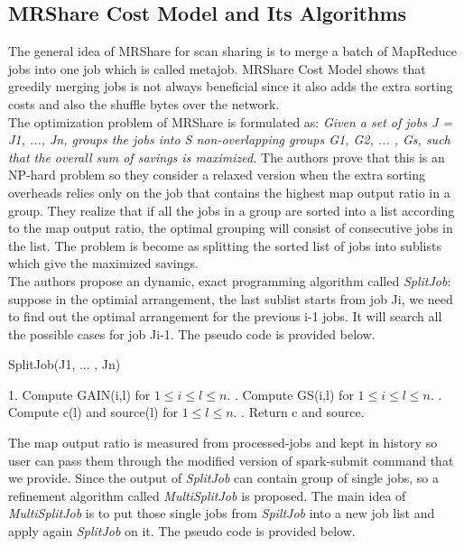 \subsection{MRShare Cost Model and Its Algorithms}
The general idea of MRShare for scan sharing is to merge a batch of MapReduce jobs into one job which is called metajob. MRShare Cost Model shows that greedily merging jobs is not always beneficial since it also adds the extra sorting costs and also the shuffle bytes over the network.\\
The optimization problem of MRShare is formulated as: \textit{Given a set of jobs J = {J1, ..., Jn}, groups the jobs into S non-overlapping groups G1, G2, ... , Gs, such that the overall sum of savings is maximized.} The authors prove that this is an NP-hard problem so they consider a relaxed version when the extra sorting overheads relies only on the job that contains the highest map output ratio in a group. They realize that if all the jobs in a group are sorted into a list according to the map output ratio, the optimal grouping will consist of consecutive jobs in the list. The problem is become as splitting the sorted list of jobs into sublists which give the maximized savings.\\
The authors propose an dynamic, exact programming algorithm called \textit{SplitJob}: suppose in the optimial arrangement, the last sublist starts from job Ji, we need to find out the optimal arrangement for the previous i-1 jobs. It will search all the possible cases for job Ji-1. The pseudo code is provided below.

\begin{algorithm}
\caption{SplitJob(J1, ... , Jn)}
1. Compute GAIN(i,l) for  $1 \leq i \leq l \leq n$. . Compute GS(i,l) for  $1 \leq i \leq l \leq n$. . Compute c(l) and source(l) for $1 \leq l \leq n$. . Return c and source.
\end{algorithm}

The map output ratio is measured from processed-jobs and kept in history so user can pass them through the modified version of spark-submit command that we provide. Since the output of \textit{SplitJob} can contain group of single jobs, so a refinement algorithm called \textit{MultiSplitJob} is proposed. The main idea of \textit{MultiSplitJob} is to put those single jobs from \textit{SpiltJob} into a new job list and apply again \textit{SplitJob} on it. The pseudo code is provided below.


